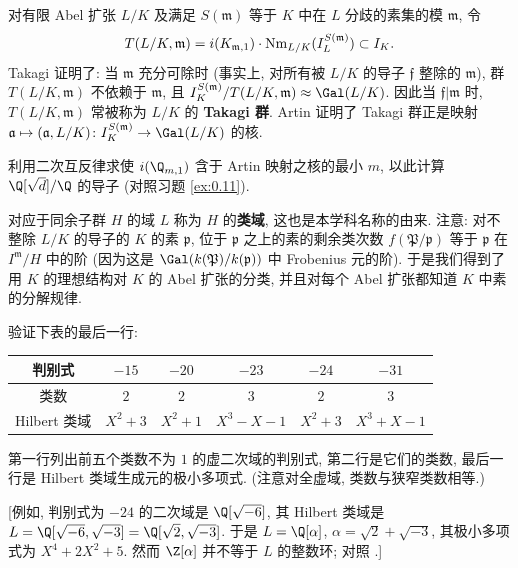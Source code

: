 \begin{remark}\label{rem:v.3.12}
对有限 Abel 扩张 $L/K$ 及满足 $S(\mathfrak{m})$ 等于 $K$ 中在 $L$ 分歧的素集的模 $\mathfrak{m}$, 令
\[
T(L/K,\mathfrak{m})=i(K_{\mathfrak{m},1})\cdot\operatorname{Nm}_{L/K}(I_L^{S(\mathfrak{m})})\subset I_K.
\]
Takagi 证明了: 当 $\mathfrak{m}$ 充分可除时 (事实上, 对所有被 $L/K$ 的导子 $\mathfrak{f}$ 整除的 $\mathfrak{m}$), 群 $T(L/K,\mathfrak{m})$ 不依赖于 $\mathfrak{m}$, 且 $I_K^{S(\mathfrak{m})}/T(L/K,\mathfrak{m})\approx\Gal(L/K)$. 因此当 $\mathfrak{f}|\mathfrak{m}$ 时, $T(L/K,\mathfrak{m})$ 常被称为 $L/K$ 的 \textbf{Takagi 群}. Artin 证明了 Takagi 群正是映射 $\mathfrak{a}\mapsto(\mathfrak{a},L/K)\colon I_K^{S(\mathfrak{m})}\to\Gal(L/K)$ 的核.
\end{remark}

\begin{exercise}\label{exc:v.3.13}
利用二次互反律求使 $i(\Q_{m,1})$ 含于 Artin 映射之核的最小 $m$, 以此计算 $\Q[\sqrt{d}]/\Q$ 的导子 (对照习题 \ref{ex:0.11}).
\end{exercise}

对应于同余子群 $H$ 的域 $L$ 称为 $H$ 的\textbf{类域}, 这也是本学科名称的由来. 注意: 对不整除 $L/K$ 的导子的 $K$ 的素 $\mathfrak{p}$, 位于 $\mathfrak{p}$ 之上的素的剩余类次数 $f(\mathfrak{P}/\mathfrak{p})$ 等于 $\mathfrak{p}$ 在 $I^{\mathfrak{m}}/H$ 中的阶 (因为这是 $\Gal(k(\mathfrak{P})/k(\mathfrak{p}))$ 中 Frobenius 元的阶). 于是我们得到了用 $K$ 的理想结构对 $K$ 的 Abel 扩张的分类, 并且对每个 Abel 扩张都知道 $K$ 中素的分解规律.

\begin{exercise}\label{exc:v.3.14}
验证下表的最后一行:
\begin{center}
\begin{tabular}{|c|c|c|c|c|c|}
\hline
判别式 & $-15$ & $-20$ & $-23$ & $-24$ & $-31$\\
\hline
类数 & $2$ & $2$ & $3$ & $2$ & $3$\\
\hline
Hilbert 类域 & $X^2+3$ & $X^2+1$ & $X^3-X-1$ & $X^2+3$ & $X^3+X-1$\\
\hline
\end{tabular}
\end{center}
第一行列出前五个类数不为 $1$ 的虚二次域的判别式, 第二行是它们的类数, 最后一行是 Hilbert 类域生成元的极小多项式. (注意对全虚域, 类数与狭窄类数相等.)

[例如, 判别式为 $-24$ 的二次域是 $\Q[\sqrt{-6}]$, 其 Hilbert 类域是 $L=\Q[\sqrt{-6},\sqrt{-3}]=\Q[\sqrt{2},\sqrt{-3}]$. 于是 $L=\Q[\alpha]$, $\alpha=\sqrt{2}+\sqrt{-3}$, 其极小多项式为 $X^4+2X^2+5$. 然而 $\Z[\alpha]$ 并不等于 $L$ 的整数环; 对照 .]
\end{exercise}

